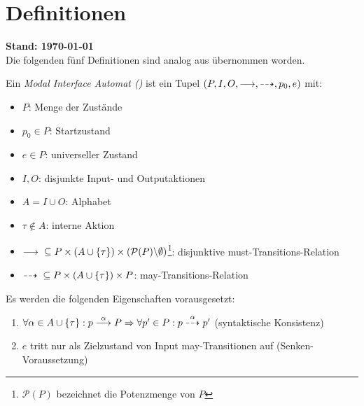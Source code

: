 \chapter{Definitionen}
{\large\textbf{Stand: \today{}}}\\

Die folgenden fünf Definitionen sind analog aus\cite{Vogler2016MIA3} übernommen
worden.

\begin{Def}
  Ein \emph{Modal Interface Automat (\MIA{})} ist ein Tupel
  $(P,I,O,\must,\may,p_0,e)$ mit:
  \begin{itemize}
    \item $P$: Menge der Zustände
    \item $p_0\in P$: Startzustand
    \item $e\in P$: universeller Zustand
    \item $I,O$: disjunkte Input- und Outputaktionen
    \item $A = I\cup O$: Alphabet
    \item $\tau\notin A$: interne Aktion
    \item $\must{} \subseteq P\times (A\cup\{\tau\})\times
      (\mathcal{P}(P)\backslash\emptyset )$\footnote{$\mathcal{P}(P)$
      bezeichnet die Potenzmenge von $P$}: disjunktive
      must-Transitions-Relation
    \item $\may{} \subseteq P\times (A\cup\{\tau\})\times
      P$: may-Transitions-Relation
  \end{itemize}
  Es werden die folgenden Eigenschaften vorausgesetzt:
  \begin{enumerate}
    \item $\forall\alpha\in A\cup\{\tau\}:p\must[\alpha]P
      \Rightarrow\forall p'\in P:p\may[\alpha]p'$
      (syntaktische Konsistenz)
    \item $e$ tritt nur als Zielzustand von Input may-Transitionen auf
      (Senken-Voraussetzung) 
  \end{enumerate}
\end{Def}

